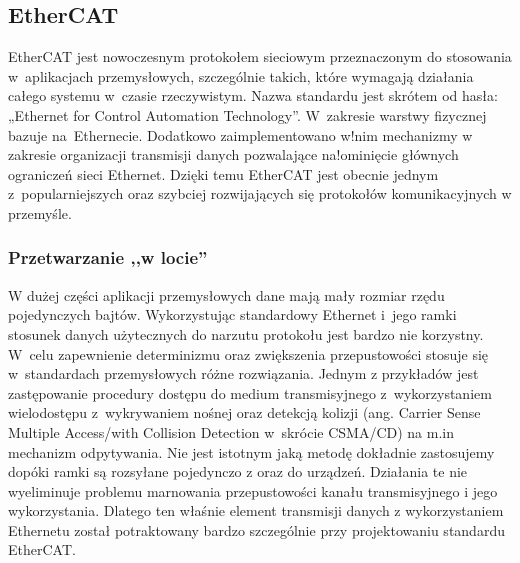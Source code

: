 \subsection{EtherCAT}

EtherCAT jest nowoczesnym protokołem sieciowym przeznaczonym do stosowania w~aplikacjach przemysłowych, szczególnie takich, które wymagają działania całego systemu w~czasie rzeczywistym. Nazwa standardu jest skrótem od hasła: „Ethernet for Control Automation Technology”. W~zakresie warstwy fizycznej bazuje na~Ethernecie. Dodatkowo zaimplementowano w!nim mechanizmy w zakresie organizacji transmisji danych pozwalające na!ominięcie głównych ograniczeń sieci Ethernet. Dzięki temu EtherCAT jest obecnie jednym z~popularniejszych oraz szybciej rozwijających się protokołów komunikacyjnych w przemyśle.

\subsubsection{Przetwarzanie ,,w locie''}
W dużej części aplikacji przemysłowych dane mają mały rozmiar rzędu pojedynczych bajtów. Wykorzystując standardowy Ethernet i~jego ramki stosunek danych użytecznych do narzutu protokołu jest bardzo nie korzystny. 
W~celu zapewnienie determinizmu oraz zwiększenia przepustowości stosuje się w~standardach przemysłowych różne rozwiązania. Jednym z przykładów jest zastępowanie procedury dostępu do medium transmisyjnego z~wykorzystaniem wielodostępu z~wykrywaniem nośnej oraz detekcją kolizji (ang. Carrier Sense Multiple Access/with Collision Detection w~skrócie CSMA/CD) na m.in mechanizm odpytywania.
Nie jest istotnym jaką metodę dokładnie zastosujemy dopóki ramki są rozsyłane pojedynczo z oraz do urządzeń. Działania te nie wyeliminuje problemu marnowania przepustowości kanału transmisyjnego i jego wykorzystania. Dlatego ten właśnie element transmisji danych z wykorzystaniem Ethernetu został potraktowany bardzo szczególnie przy projektowaniu standardu EtherCAT.

